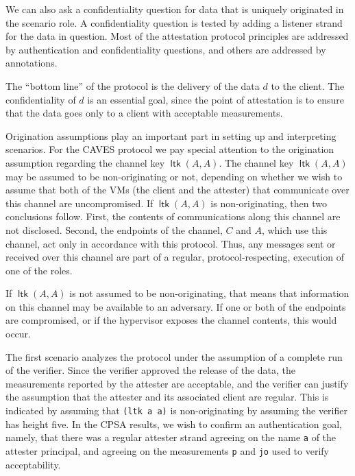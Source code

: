 \documentclass[titlepage,12pt]{article}
\theoremstyle{definition}
\DeclareMathOperator{\ltk}{\mathsf{ltk}}
\begin{document}
We can also ask a confidentiality question for data that is uniquely
originated in the scenario role. A confidentiality question is tested
by adding a listener strand for the data in question.
Most of the attestation protocol principles are addressed by
authentication and confidentiality questions, and others are addressed
by annotations.

The ``bottom line'' of the protocol is the delivery of the data
$d$ to the client. The confidentiality of $d$ is an essential goal,
since the point of attestation is to ensure that the data goes only
to a client with acceptable measurements.

Origination assumptions play an important part in setting up and
interpreting scenarios.  For the CAVES protocol we pay special
attention to the origination assumption regarding the channel key
$\ltk(A,A)$.  The channel key ${\ltk(A,A)}$ may be assumed to be
non-originating or not, depending on whether we wish to assume that
both of the VMs (the client and the attester) that communicate over
this channel are uncompromised. If ${\ltk(A,A)}$ is non-originating,
then two conclusions follow.  First, the contents of communications
along this channel are not disclosed.  Second, the endpoints of the
channel, $C$ and $A$, which use this channel, act only in accordance
with this protocol.  Thus, any messages sent or received over this
channel are part of a regular, protocol-respecting, execution of one
of the roles.

If ${\ltk(A,A)}$ is not assumed to be non-originating, that means that
information on this channel may be available to an adversary.  If one
or both of the endpoints are compromised, or if the hypervisor exposes
the channel contents, this would occur.

The first scenario analyzes the protocol under the assumption of a
complete run of the verifier.  Since the verifier approved the release of
the data, the measurements reported by the attester are acceptable,
and the verifier can justify the assumption that the attester and
its associated client are regular. This is
indicated by assuming that \texttt{(ltk a a)} is non-originating by
assuming the verifier has height five.
In the CPSA results, we wish to confirm an authentication goal,
namely, that there was a regular attester strand agreeing on
the name \texttt{a} of the attester principal, and agreeing on the
measurements \texttt{p} and \texttt{jo} used to verify acceptability.
\end{document}
